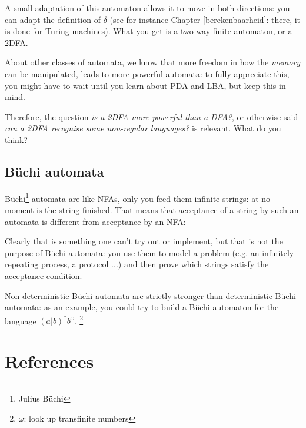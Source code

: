 A small adaptation of this automaton allows it to move in both
directions: you can adapt the definition of $\delta$ (see for instance
Chapter \ref{berekenbaarheid}: there, it is done for Turing
machines). What you get is a two-way finite automaton, or a 2DFA.

About other classes of automata, we know that more freedom in how the
{\em memory} can be manipulated, leads to more powerful automata: to
fully appreciate this, you might have to wait until you learn about
PDA and LBA, but keep this in mind.

Therefore, the question {\em is a 2DFA more powerful than a DFA?}, or
otherwise said {\em can a 2DFA recognise some non-regular languages?}
is relevant. What do you think?


\clearpage
\subsection{B\"{u}chi automata}

B\"{u}chi\footnote{Julius B\"{u}chi} automata are like NFAs, only you
feed them infinite strings: at no moment is the string finished.
That means that acceptance of a string by such an automata is
different from acceptance by an NFA:


Clearly that is something one can't try out or implement, but that is
not the purpose of B\"{u}chi automata: you use them to model a problem
(e.g. an infinitely repeating process, a protocol ...) and then prove
which strings satisfy the acceptance condition.

Non-deterministic B\"{u}chi automata are strictly stronger than
deterministic B\"{u}chi automata: as an example, you could try to
build a B\"{u}chi automaton for the language $(a|b)^*b^\omega$. \footnote{$\omega$: look up transfinite numbers}



\clearpage
\section{References}

